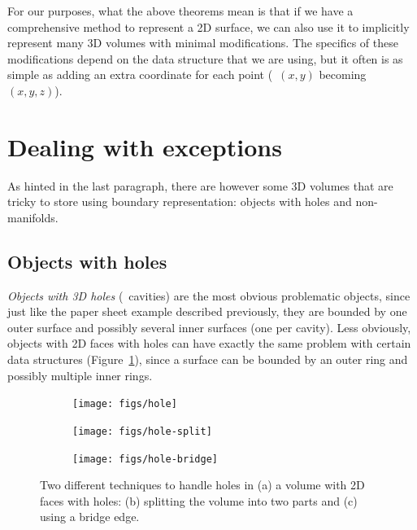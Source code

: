 For our purposes, what the above theorems mean is that if we have a comprehensive method to represent a 2D surface, we can also use it to implicitly represent many 3D volumes with minimal modifications.
The specifics of these modifications depend on the data structure that we are using, but it often is as simple as adding an extra coordinate for each point (\ie\ $(x, y)$ becoming $(x, y, z)$).

\section{Dealing with exceptions}

As hinted in the last paragraph, there are however some 3D volumes that are tricky to store using boundary representation: objects with holes and non-manifolds.

\subsection{Objects with holes}

\emph{Objects with 3D holes} (\ie\ cavities) are the most obvious problematic objects, since just like the paper sheet example described previously, they are bounded by one outer surface and possibly several inner surfaces (one per cavity).
Less obviously, objects with 2D faces with holes can have exactly the same problem with certain data structures (Figure~\ref{subfig:hole}), since a surface can be bounded by an outer ring and possibly multiple inner rings.

\begin{figure}
\centering
\begin{subfigure}[b]{0.3\linewidth}
\texttt{[image: figs/hole]}
\caption{}%
\label{subfig:hole}
\end{subfigure}
\quad
\begin{subfigure}[b]{0.3\linewidth}
\texttt{[image: figs/hole-split]}
\caption{}%
\label{subfig:hole-split}
\end{subfigure}
\begin{subfigure}[b]{0.3\linewidth}
\texttt{[image: figs/hole-bridge]}
\caption{}%
\label{subfig:hole-bridge}
\end{subfigure}
\caption[Two different techniques to handle holes]{Two different techniques to handle holes in (a) a volume with 2D faces with holes: (b) splitting the volume into two parts and (c) using a bridge edge.}%
\label{fig:hole}
\end{figure}

